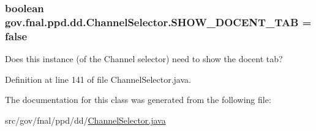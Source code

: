 \hypertarget{classgov_1_1fnal_1_1ppd_1_1dd_1_1ChannelSelector_ad9e88d31f70467252e90a59943338df0}{
\subsubsection[{S\-H\-O\-W\-\_\-\-D\-O\-C\-E\-N\-T\-\_\-\-T\-A\-B}]{\setlength{\rightskip}{0pt plus 5cm}boolean gov.\-fnal.\-ppd.\-dd.\-Channel\-Selector.\-S\-H\-O\-W\-\_\-\-D\-O\-C\-E\-N\-T\-\_\-\-T\-A\-B = false\hspace{0.3cm}{\ttfamily [static]}}}\label{classgov_1_1fnal_1_1ppd_1_1dd_1_1ChannelSelector_ad9e88d31f70467252e90a59943338df0}
Does this instance (of the Channel selector) need to show the docent tab? 

Definition at line 141 of file Channel\-Selector.\-java.



The documentation for this class was generated from the following file\-:\begin{DoxyCompactItemize}
\item 
src/gov/fnal/ppd/dd/\hyperlink{ChannelSelector_8java}{Channel\-Selector.\-java}\end{DoxyCompactItemize}
